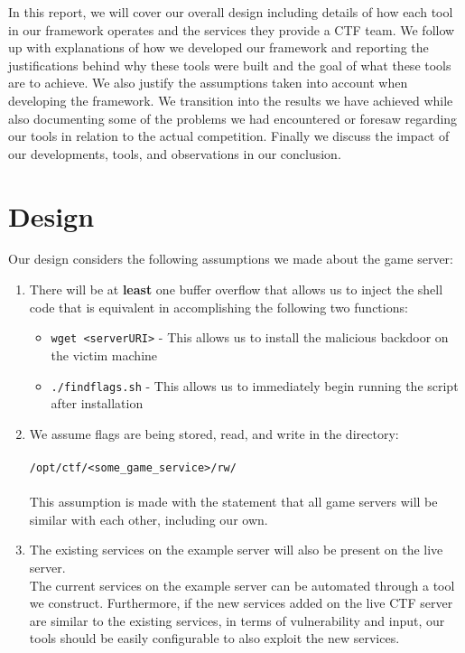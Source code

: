 \documentclass[12pt]{report}
\begin{document}
In this report, we will cover our overall design including details of how each tool in our framework operates and the services they provide a CTF team. We follow up with explanations of how we developed our framework and reporting the justifications behind why these tools were built and the goal of what these tools are to achieve. We also justify the assumptions taken into account when developing the framework. We transition into the results we have achieved while also documenting some of the problems we had encountered or foresaw regarding our tools in relation to the actual competition. Finally we discuss the impact of our developments, tools, and observations in our conclusion.

\section*{Design}
Our design considers the following assumptions we made about the game server:

\begin{enumerate}
	\item There will be at \textbf{least} one buffer overflow that allows us to inject the shell code that is equivalent in accomplishing the following two functions:
	\begin{itemize}
		\item \texttt{wget <serverURI>} - This allows us to install the malicious backdoor on the victim machine
		\item \texttt{./findflags.sh} - This allows us to immediately begin running the script after installation
	\end{itemize}
	\item We assume flags are being stored, read, and write in the directory: \\\\ \texttt{/opt/ctf/<some\_game\_service>/rw/} \\\\
	This assumption is made with the statement that all game servers will be similar with each other, including our own. 
	\item The existing services on the example server will also be present on the live server.\\ 
	The current services on the example server can be automated through a tool we construct. Furthermore, if the new services added on the live CTF server are similar to the existing services, in terms of vulnerability and input, our tools should be easily configurable to also exploit the new services.
\end{enumerate}
\end{document}
